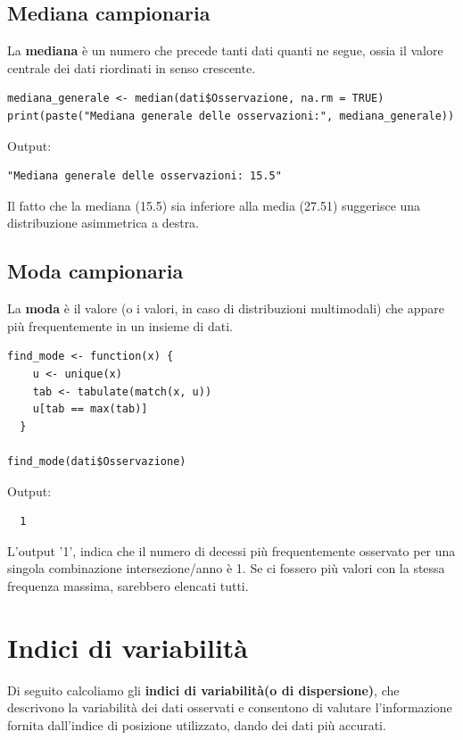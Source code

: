 \documentclass[14pt, openany, titlepage]{report} %
\begin{document}
\section{Mediana campionaria}
La \textbf{mediana} è un numero che precede tanti dati quanti ne segue, ossia il 
valore centrale dei dati riordinati in senso crescente.
\begin{center}
\begin{lstlisting}[breaklines=true]
mediana_generale <- median(dati$Osservazione, na.rm = TRUE)
print(paste("Mediana generale delle osservazioni:", mediana_generale))
\end{lstlisting}  
\end{center}
\noindent
Output:
\begin{verbatim}
"Mediana generale delle osservazioni: 15.5"
\end{verbatim}
 Il fatto che la mediana (15.5)
 sia inferiore alla media (27.51) suggerisce una distribuzione 
 asimmetrica a destra.

\section{Moda campionaria}
La \textbf{moda} è il valore (o i valori, in caso di distribuzioni multimodali)
 che appare più frequentemente in un insieme di dati.
\begin{center}
\begin{lstlisting}[breaklines=true]
find_mode <- function(x) {
    u <- unique(x)
    tab <- tabulate(match(x, u))
    u[tab == max(tab)]
  }

find_mode(dati$Osservazione)
\end{lstlisting}  
\end{center}
\noindent
Output:
\begin{verbatim}
  1 
\end{verbatim}
L'output '1', indica che il numero di decessi 
più frequentemente osservato per una singola combinazione 
intersezione/anno è 1. Se ci fossero più valori con la stessa 
frequenza massima, sarebbero elencati tutti.


\chapter{Indici di variabilità} 
Di seguito calcoliamo gli \textbf{indici di variabilità(o di dispersione)}, che descrivono la 
variabilità dei dati osservati e consentono di valutare l'informazione 
fornita dall'indice di posizione utilizzato, dando dei dati più accurati.
\end{document}
